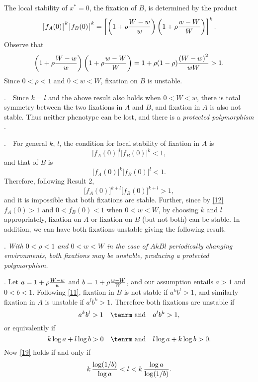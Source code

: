 \documentclass[9pt,twocolumn,twoside,lineno]{pnas-new}
\begin{document}
    The local stability of $x^*=0$, the fixation of $B$, is determined by the product
   \begin{equation}
   \bigl[f_A(0)\bigr]^k \bigl[f_B(0)\bigr]^k=\left[\left(1+\rho{W-w\over w}\right)\left(1+\rho{w-W\over W}\right)\right]^k.\label{13}\end{equation}
   Observe that
   \begin{equation}
   \left(1+\rho{W-w\over w}\right)\left(1+\rho{w-W\over W}\right) = 1+\rho(1-\rho){\left(W-w\right)^2\over wW}>1.\label{14}\end{equation}
   Since $0<\rho<1$ and $0<w<W$,  fixation on $B$ is unstable.
  \bigskip

\smallskip

.\ \ Since $k=l$ and the above result also holds  when $0<W<w$, there is total symmetry between the two fixations in $A$ and $B$, and fixation in $A$ is also not stable. Thus neither phenotype can be lost, and there is a {\sl protected polymorphism} \cite{prout1968sufficient}.
\smallskip

.\ \ For general $k$, $l$, the condition for local stability of fixation in $A$ is
\begin{equation}\bigl[f_A(0)\bigr]^l \bigl[f_B(0)\bigr]^k <1, \label{15}\end{equation}
and that of $B$ is
\begin{equation}\bigl[f_A(0)\bigr]^k \bigl[f_B(0)\bigr]^l <1. \label{16}\end{equation}
Therefore, following Result 2, 
\begin{equation}\bigl[f_A(0)\bigr]^{k+l}\bigl[f_B(0)\bigr]^{k+l}>1,\label{17}\end{equation}
and it is impossible that both fixations are stable. Further, since by \eqref{12}  $f_A(0)>1$ and $0<f_B(0)<1$ when $0<w<W$, by choosing $k$ and $l$ appropriately, fixation on $A$ or fixation on $B$ (but not both) can be stable. In addition, we can have both fixations unstable giving the following result.
\medskip

. {\sl With $0<\rho<1$ and $0<w<W$ in the case of $AkBl$ periodically changing environments, both fixations may be unstable, producing a protected polymorphism.}\par
\medskip

. Let $a=1+\rho{W-w\over w}$ and $b=1+\rho{w-W\over W}$, and our assumption entails  $a>1$ and $0<b<1$. Following \eqref{11}, fixation in $B$ is not stable if $a^kb^l>1$, and similarly  fixation in $A$ is unstable if $a^lb^k>1$. Therefore both fixations are unstable if
\begin{equation}a^kb^l>1\quad\hbox{\tenrm and}\quad a^lb^k>1,\label{18}\end{equation}
or equivalently if
\begin{equation}k\log a +l\log b>0\quad\hbox{\tenrm and}\quad l\log a+k\log b>0.\label{19}\end{equation}
Now \eqref{19} holds if and only if
\begin{equation}k\,{\log(1/b)\over\log a} < l < k\,{\log a\over\log(1/b)}.\label{20}\end{equation} 
\end{document}
